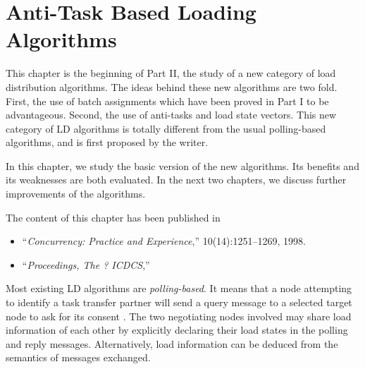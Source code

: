 %


\chapter{Anti-Task Based Loading Algorithms}

{
This chapter is the beginning of Part II, the study of a new
category of load distribution algorithms.
The ideas behind these new algorithms are two fold.
First, the use of batch assignments which have been proved in Part I 
to be advantageous.
Second, the use of anti-tasks and load state vectors.
This new category of LD algorithms is totally different from
the usual polling-based algorithms, and is first proposed by the writer.

In this chapter, we study the basic version of the new algorithms.
Its benefits and its weaknesses are both evaluated.
In the next two chapters, we discuss further improvements of the algorithms.

\small
The content of this chapter has been published in
\begin{itemize}
\item	``{\it Concurrency: Practice and Experience},''
	10(14):1251--1269, 1998.
\item	``{\it Proceedings, The ? ICDCS},''
\end{itemize}
}

Most existing LD algorithms are {\it polling-based\/}.
It means that a node attempting to identify a task transfer partner
will send a query message to a selected target node to ask for its consent
\cite{casavant88,eager86a,eager86b,lu94,lu95b,shiv90,wang85}.
The two negotiating nodes involved may share load information of each other
by explicitly declaring
their load states in the polling and reply messages.
Alternatively, load information can be deduced from the
semantics of messages exchanged.